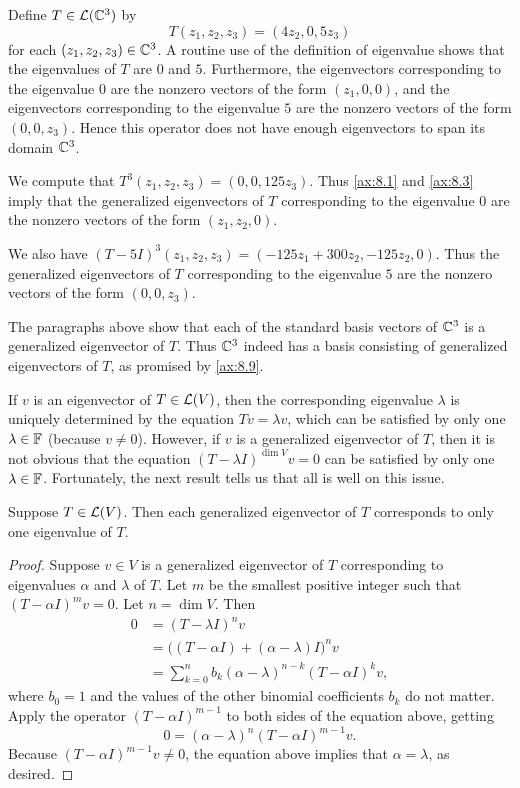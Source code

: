 \begin{example}\label{ax:8.10}
Define $T\in\mathcal{L}(\mathbb{C}^3)$ by
\[ T(z_1,z_2,z_3) = (4z_2,0,5z_3) \]
for each $(z_1,z_2,z_3)\in\mathbb{C}^3$. A routine use of the definition of eigenvalue
shows that the eigenvalues of $T$ are $0$ and $5$. Furthermore, the
eigenvectors corresponding to the eigenvalue $0$ are the nonzero vectors of the
form $(z_1,0,0)$, and the eigenvectors corresponding to the eigenvalue $5$ are
the nonzero vectors of the form $(0,0,z_3)$. Hence this operator does not have
enough eigenvectors to span its domain $\mathbb{C}^3$.

We compute that $T^3(z_1,z_2,z_3)=(0,0,125z_3)$. Thus \ref{ax:8.1} and
\ref{ax:8.3} imply that the generalized eigenvectors of $T$ corresponding to the
eigenvalue $0$ are the nonzero vectors of the form $(z_1,z_2,0)$.

We also have $(T-5I)^3(z_1,z_2,z_3)=(-125z_1+300z_2,-125z_2,0)$. Thus the
generalized eigenvectors of $T$ corresponding to the eigenvalue $5$ are the
nonzero vectors of the form $(0,0,z_3)$.

The paragraphs above show that each of the standard basis vectors of $\mathbb{C}^3$ is a
generalized eigenvector of $T$. Thus $\mathbb{C}^3$ indeed has a basis consisting of
generalized eigenvectors of $T$, as promised by \ref{ax:8.9}.
\end{example}

If $v$ is an eigenvector of $T\in\mathcal{L}(V)$, then the corresponding eigenvalue
$\lambda$ is uniquely determined by the equation $Tv=\lambda v$, which can be
satisfied by only one $\lambda\in\mathbb{F}$ (because $v\ne0$). However, if $v$ is a
generalized eigenvector of $T$, then it is not obvious that the equation
$(T-\lambda I)^{\dim V}v=0$ can be satisfied by only one $\lambda\in\mathbb{F}$.
Fortunately, the next result tells us that all is well on this issue.

\begin{result}\label{ax:8.11}
Suppose $T\in\mathcal{L}(V)$. Then each generalized eigenvector of $T$ corresponds to
only one eigenvalue of $T$.
\end{result}

\begin{proof}
Suppose $v\in V$ is a generalized eigenvector of $T$ corresponding to
eigenvalues $\alpha$ and $\lambda$ of $T$. Let $m$ be the smallest positive
integer such that $(T-\alpha I)^mv=0$. Let $n=\dim V$. Then
\begin{align*}
0 &= (T-\lambda I)^nv\\
  &= \bigl((T-\alpha I)+(\alpha-\lambda)I\bigr)^nv\\
  &= \sum_{k=0}^{n} b_k(\alpha-\lambda)^{n-k}(T-\alpha I)^kv,
\end{align*}
where $b_0=1$ and the values of the other binomial coefficients $b_k$ do not
matter. Apply the operator $(T-\alpha I)^{m-1}$ to both sides of the equation
above, getting
\[ 0 = (\alpha-\lambda)^n(T-\alpha I)^{m-1}v. \]
Because $(T-\alpha I)^{m-1}v\ne0$, the equation above implies that
$\alpha=\lambda$, as desired.
\end{proof}

